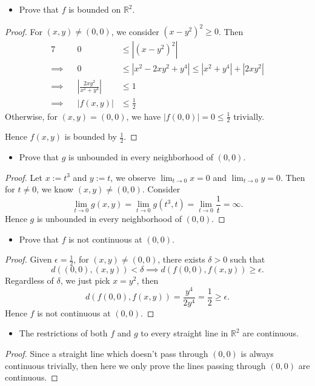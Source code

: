 \begin{Exercise}
\begin{itemize}
\item Prove that $f$ is bounded on $\mathbb{R}^2$.
\end{itemize}
\begin{proof}
For $(x,y) \neq (0,0)$, we consider $(x-y^2)^2 \geq 0$. Then
\begin{alignat*}{7}
\quad&& 0 &\leq \left| (x-y^2)^2 \right| \\
\implies&& 0 &\leq \left| x^2 - 2x y^2+ y^4 \right| \leq |x^2+y^4|+|2x y^2| \\
\implies&& \left| \frac{2 x y^2}{x^2+y^4} \right| &\leq 1 \\
\implies&& |f(x,y)| &\leq \frac{1}{2}
\end{alignat*}
Otherwise, for $(x,y)=(0,0)$, we have $|f(0,0)| = 0 \leq \frac{1}{2}$ trivially.

Hence $f(x,y)$ is bounded by $\frac{1}{2}$.
\end{proof}

\begin{itemize}
\item Prove that $g$ is unbounded in every neighborhood of $(0,0)$.
\end{itemize}
\begin{proof}
Let $x := t^3$ and $y := t$, we observe $\lim_{t\to 0} x = 0$ and $\lim_{t\to 0} y = 0$. Then for $t\neq 0$, we know $(x,y) \neq (0,0)$. Consider
$$
\lim_{t\to 0} g(x,y) = \lim_{t\to 0} g(t^3,t) = \lim_{t\to 0}\frac{1}{t} = \infty.
$$
Hence $g$ is unbounded in every neighborhood of $(0,0)$.
\end{proof}

\begin{itemize}
\item Prove that $f$ is not continuous at $(0,0)$.
\end{itemize}
\begin{proof}
Given $\epsilon = \frac{1}{2}$, for $(x,y)\neq (0,0)$, there exists $\delta > 0$ such that
$$
d( (0,0),(x,y) ) <\delta \implies d(f(0,0),f(x,y))\geq \epsilon.
$$
Regardless of $\delta$, we just pick $x=y^2$, then
$$
d(f(0,0),f(x,y)) = \frac{y^4}{2y^4} = \frac{1}{2} \geq \epsilon.
$$
Hence $f$ is not continuous at $(0,0)$.
\end{proof}

\begin{itemize}
\item The restrictions of both $f$ and $g$ to every straight line in $\mathbb{R}^2$ are continuous. 
\end{itemize}
\begin{proof}
Since a straight line which doesn't pass through $(0,0)$ is always continuous trivially, then here we only prove the lines passing through $(0,0)$ are continuous.


\end{proof}
\end{Exercise}
